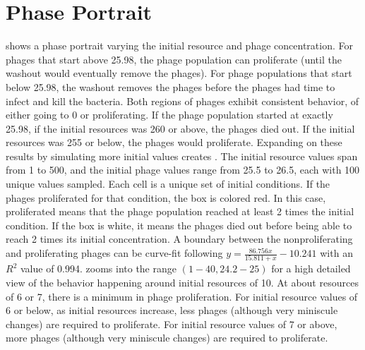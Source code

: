 \section{Phase Portrait}
\label{sec:results:phase_portrait}
 shows a phase portrait varying the initial resource and phage concentration. 
For phages that start above 25.98, the phage population can proliferate (until the washout would eventually remove the phages). 
For phage populations that start below 25.98, the washout removes the phages before the phages had time to infect and kill the bacteria. 
Both regions of phages exhibit consistent behavior, of either going to 0 or proliferating. 
If the phage population started at exactly 25.98, if the initial resources was 260 or above, the phages died out. 
If the initial resources was 255 or below, the phages would proliferate. 
Expanding on these results by simulating more initial values creates . 
The initial resource values span from 1 to 500, and the initial phage values range from 25.5 to 26.5, each with 100 unique values sampled.
Each cell is a unique set of initial conditions. 
If the phages proliferated for that condition, the box is colored red. 
In this case, proliferated means that the phage population reached at least 2 times the initial condition. 
If the box is white, it means the phages died out before being able to reach 2 times its initial concentration. 
A boundary between the nonproliferating and proliferating phages can be curve-fit following $y=\frac{86.756x}{15.811+x} - 10.241$ with an $R^2$ value of 0.994. 
 zooms into the range $(1-40, 24.2-25)$ for a high detailed view of the behavior happening around initial resources of 10. 
At about resources of 6 or 7, there is a minimum in phage proliferation. 
For initial resource values of 6 or below, as initial resources increase, less phages (although very miniscule changes) are required to proliferate. 
For initial resource values of 7 or above, more phages (although very miniscule changes) are required to proliferate. 

